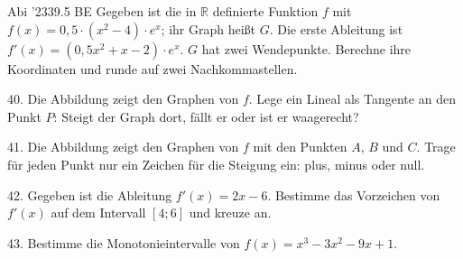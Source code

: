 \documentclass[11pt]{article}
\begin{document}
\pfgruppe{}
\begin{pfaufg}{Abi ’23}{39.}{5 BE}
Gegeben ist die in $\mathbb{R}$ definierte Funktion $f$ mit $f(x) = 0{,}5\cdot(x^2 - 4)\cdot e^x$; ihr Graph heißt $G$. Die erste Ableitung ist $f'(x) = (0{,}5x^2 + x - 2)\cdot e^x$. $G$ hat zwei Wendepunkte. Berechne ihre Koordinaten und runde auf zwei Nachkommastellen.
\end{pfaufg}
\pfgruppe{}
\begin{pfaufg}{}{40.}{}
Die Abbildung zeigt den Graphen von $f$. Lege ein Lineal als Tangente an den Punkt $P$: Steigt der Graph dort, fällt er oder ist er waagerecht? 
\par\smallskip\noindent \begin{ksys}[xmin=-3,xmax=3,ymin=-3,ymax=3,ablesen]   \end{ksys}\par
{}
\end{pfaufg}
\begin{pfaufg}{}{41.}{}
Die Abbildung zeigt den Graphen von $f$ mit den Punkten $A$, $B$ und $C$. Trage für jeden Punkt nur ein Zeichen für die Steigung ein: plus, minus oder null.
\par\smallskip\noindent \begin{ksys}[xmin=-3,xmax=3,ymin=-3,ymax=3,ablesen]     \end{ksys}\par
{}
\end{pfaufg}
\pfgruppe{}
\begin{pfaufg}{}{42.}{}
Gegeben ist die Ableitung $f'(x) = 2x - 6$. Bestimme das Vorzeichen von $f'(x)$ auf dem Intervall $[4; 6]$ und kreuze an. 
\end{pfaufg}
\pfgruppe{}
\begin{pfaufg}{}{43.}{}
Bestimme die Monotonieintervalle von $f(x) = x^3 - 3x^2 - 9x + 1$.
\end{pfaufg}
\end{document}
